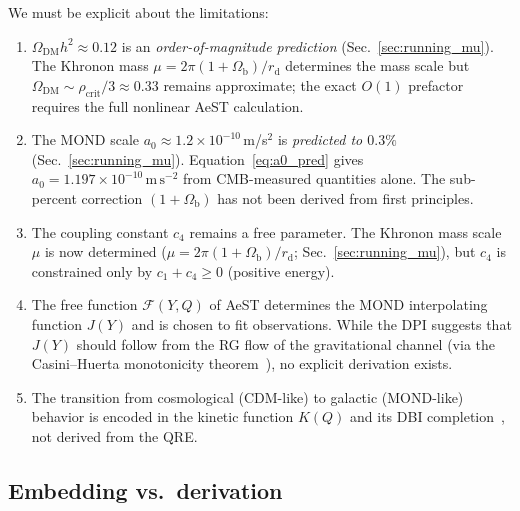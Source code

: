 \documentclass[prd,twocolumn,superscriptaddress,longbibliography,floatfix]{revtex4-2}
\newcommand{\OmDM}{\Omega_{\mathrm{DM}}}
\begin{document}
We must be explicit about the limitations:
\begin{enumerate}
\item $\OmDM h^2 \approx 0.12$ is an
  \emph{order-of-magnitude prediction}
  (Sec.~\ref{sec:running_mu}).  The Khronon mass
  $\mu = 2\pi(1+\Omega_{\mathrm{b}})/r_{\mathrm{d}}$
  determines the mass scale but
  $\OmDM \sim \rho_{\mathrm{crit}}/3 \approx 0.33$
  remains approximate; the exact $O(1)$ prefactor
  requires the full nonlinear AeST calculation.
\item The MOND scale $a_0 \approx 1.2 \times 10^{-10}$\,m/s$^2$
  is \emph{predicted to $0.3\%$}
  (Sec.~\ref{sec:running_mu}).
  Equation~\eqref{eq:a0_pred} gives
  $a_0 = 1.197 \times 10^{-10}\,\mathrm{m\,s}^{-2}$
  from CMB-measured quantities alone.  The sub-percent
  correction $(1+\Omega_{\mathrm{b}})$ has not been
  derived from first principles.
\item The coupling constant $c_4$ remains a free parameter.
  The Khronon mass scale $\mu$ is now determined
  ($\mu = 2\pi(1+\Omega_{\mathrm{b}})/r_{\mathrm{d}}$;
  Sec.~\ref{sec:running_mu}), but $c_4$ is constrained
  only by $c_1 + c_4 \geq 0$ (positive energy).
\item The free function $\mathcal{F}(Y,Q)$ of AeST
  determines the MOND interpolating function $J(Y)$
  and is chosen to fit observations.  While the DPI
  suggests that $J(Y)$ should follow from the RG
  flow of the gravitational channel (via the
  Casini--Huerta monotonicity
  theorem~\cite{CasiniHuerta2017}), no explicit
  derivation exists.
\item The transition from cosmological (CDM-like) to
  galactic (MOND-like) behavior is encoded in the
  kinetic function $K(Q)$ and its DBI
  completion~\cite{BlanchetSkordis2024}, not derived
  from the QRE.
\end{enumerate}

\subsection{Embedding vs.\ derivation}
\end{document}

